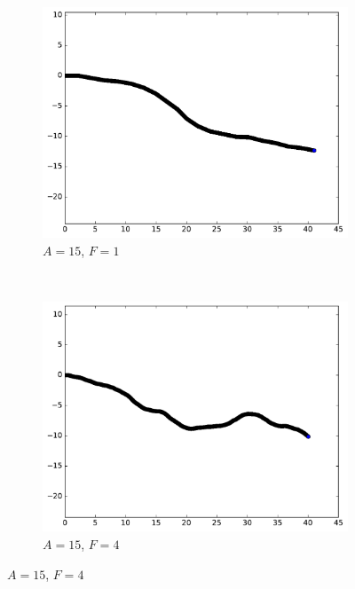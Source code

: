 	\newcommand{\subImgWarea}{0.42\textwidth}
	\newcommand{\subImgWmo}{0.32\textwidth}
	\begin{figure}[htb]
		\begin{subfigure}[t]{\subImgWmo}
			\centering
			\includegraphics[width=\textwidth]{figures/ch3/synTraj_219_15_1}
			\caption[$A = 15$, $F=1$]{$A = 15$, $F=1$}
			\label{fig:synTraj_219_15_1}
		\end{subfigure}
		~
		\begin{subfigure}[t]{\subImgWmo}
			\centering
			\includegraphics[width=\textwidth]{figures/ch3/synTraj_219_15_4}
			\caption[$A = 15$, $F=4$]{$A = 15$, $F=4$}
			\label{fig:synTraj_219_15_4}
		\end{subfigure}

\end{figure}
